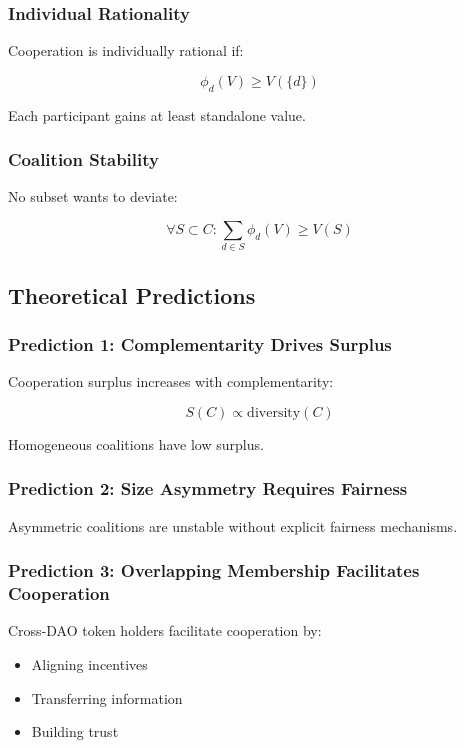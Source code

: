 \subsubsection{Individual Rationality}

Cooperation is individually rational if:

\begin{equation}
\phi_d(V) \geq V(\{d\})
\end{equation}

Each participant gains at least standalone value.

\subsubsection{Coalition Stability}

No subset wants to deviate:

\begin{equation}
\forall S \subset C: \sum_{d \in S} \phi_d(V) \geq V(S)
\end{equation}

\subsection{Theoretical Predictions}

\subsubsection{Prediction 1: Complementarity Drives Surplus}

Cooperation surplus increases with complementarity:

\begin{equation}
S(C) \propto \text{diversity}(C)
\end{equation}

Homogeneous coalitions have low surplus.

\subsubsection{Prediction 2: Size Asymmetry Requires Fairness}

Asymmetric coalitions are unstable without explicit fairness mechanisms.

\subsubsection{Prediction 3: Overlapping Membership Facilitates Cooperation}

Cross-DAO token holders facilitate cooperation by:
\begin{itemize}
    \item Aligning incentives
    \item Transferring information
    \item Building trust
\end{itemize}
